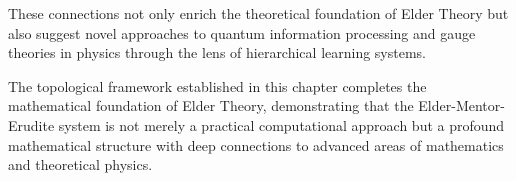These connections not only enrich the theoretical foundation of Elder Theory but also suggest novel approaches to quantum information processing and gauge theories in physics through the lens of hierarchical learning systems.

The topological framework established in this chapter completes the mathematical foundation of Elder Theory, demonstrating that the Elder-Mentor-Erudite system is not merely a practical computational approach but a profound mathematical structure with deep connections to advanced areas of mathematics and theoretical physics.